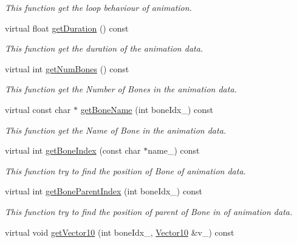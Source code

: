 \begin{DoxyCompactItemize}
\begin{DoxyCompactList}\small\item\em This function get the loop behaviour of animation. \end{DoxyCompactList}\item 
virtual float \hyperlink{class_i_dream_sky_1_1_skeletal_anim_blender_a9632809b4b59659cdd5ff4c02371229e}{get\+Duration} () const 
\begin{DoxyCompactList}\small\item\em This function get the duration of the animation data. \end{DoxyCompactList}\item 
virtual int \hyperlink{class_i_dream_sky_1_1_skeletal_anim_blender_a412fe2a0748a4462d44fd9f7355ba30c}{get\+Num\+Bones} () const 
\begin{DoxyCompactList}\small\item\em This function get the Number of Bones in the animation data. \end{DoxyCompactList}\item 
virtual const char $\ast$ \hyperlink{class_i_dream_sky_1_1_skeletal_anim_blender_aa467f64b963302adc2eb4b9e96651e49}{get\+Bone\+Name} (int bone\+Idx\+\_\+) const 
\begin{DoxyCompactList}\small\item\em This function get the Name of Bone in the animation data. \end{DoxyCompactList}\item 
virtual int \hyperlink{class_i_dream_sky_1_1_skeletal_anim_blender_a02f4b2d1c647eb6000ce4950cb1baca4}{get\+Bone\+Index} (const char $\ast$name\+\_\+) const 
\begin{DoxyCompactList}\small\item\em This function try to find the position of Bone of animation data. \end{DoxyCompactList}\item 
virtual int \hyperlink{class_i_dream_sky_1_1_skeletal_anim_blender_a37e5b879823526f0f19797416f0b8742}{get\+Bone\+Parent\+Index} (int bone\+Idx\+\_\+) const 
\begin{DoxyCompactList}\small\item\em This function try to find the position of parent of Bone in of animation data. \end{DoxyCompactList}\item 
virtual void \hyperlink{class_i_dream_sky_1_1_skeletal_anim_blender_ac31d36a225bceb45d1c2410f6819d609}{get\+Vector10} (int bone\+Idx\+\_\+, \hyperlink{class_i_dream_sky_1_1_vector10}{Vector10} \&v\+\_\+) const 

\end{DoxyCompactItemize}
